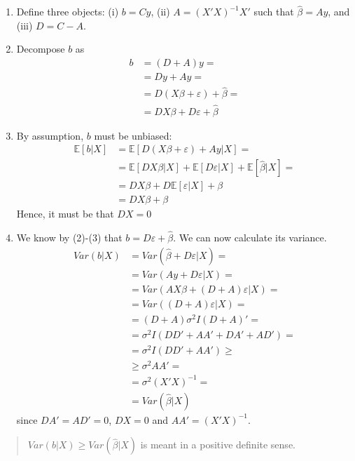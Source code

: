\documentclass[12pt,]{book}
\providecommand{\tightlist}{%
  \setlength{\itemsep}{0pt}\setlength{\parskip}{0pt}}
\begin{document}
\begin{enumerate}
\def\labelenumi{\arabic{enumi}.}
\tightlist
\item
  Define three objects: (i) \(b= Cy\), (ii) \(A = (X'X)^{-1} X'\) such that \(\hat \beta = A y\), and (iii) \(D = C-A\).
\item
  Decompose \(b\) as
  \[
  \begin{aligned}
   b &= (D + A) y = \\
   &=  Dy + Ay = \\\
   &= D (X\beta + \varepsilon) + \hat \beta = \\
   &= DX\beta + D \varepsilon + \hat \beta
  \end{aligned}
  \]
\item
  By assumption, \(b\) must be unbiased:
  \[
  \begin{aligned}
   \mathbb E [b|X] &= \mathbb E [D(X\beta + \varepsilon) + Ay |X] = \\
   &= \mathbb E [DX\beta|X] + \mathbb E [D\varepsilon |X] + \mathbb E [\hat \beta |X] = \\
   &= DX\beta + D \mathbb E [\varepsilon |X] +\beta \\\
   &= DX\beta + \beta
  \end{aligned}
  \]
  Hence, it must be that \(DX = 0\)
\item
  We know by (2)-(3) that \(b = D \varepsilon + \hat \beta\). We can now calculate its variance.
  \[
  \begin{aligned}
  Var (b|X) &= Var (\hat \beta + D\varepsilon|X) = \\
  &= Var (Ay + D\varepsilon|X) = \\
  &= Var (AX\beta + (D + A)\varepsilon|X) = \\
  &= Var((D+A)\varepsilon |X) = \\
  &= (D+A)\sigma^2 I (D+A)' = \\
  &= \sigma^2 I (DD' + AA' + DA' + AD') = \\
  &= \sigma^2 I (DD' + AA') \geq \\
  &\geq \sigma^2 AA'= \\
  &= \sigma^2 (X'X)^{-1} = \\
  &= Var (\hat \beta|X)
  \end{aligned}
  \]
  since \(DA'= AD' = 0\), \(DX = 0\) and \(AA' = (X'X)^{-1}\).
  \[\tag*{$\blacksquare$}\]
\end{enumerate}

\begin{quote}
\(Var(b | X) \geq Var (\hat{\beta} | X)\) is meant in a positive definite sense.
\end{quote}
\end{document}
